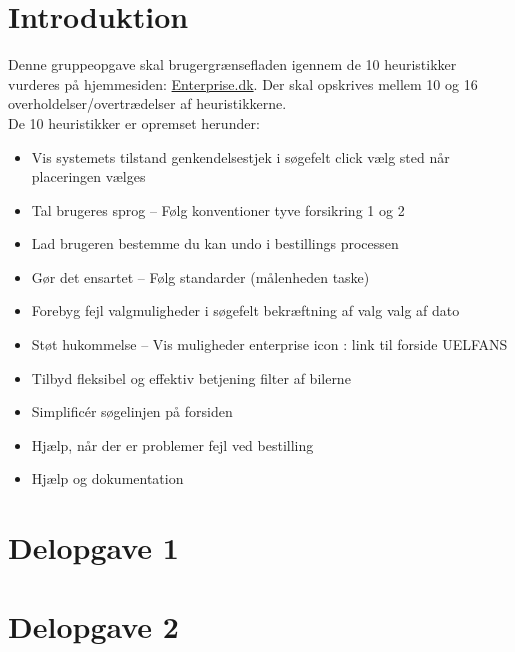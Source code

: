 \documentclass[a4paper,10pt]{article}
\begin{document}
\section*{Introduktion}
Denne gruppeopgave skal brugergrænsefladen igennem de 10 heuristikker vurderes på hjemmesiden: \href{http://enterprise.dk}{Enterprise.dk}. Der skal opskrives mellem 10 og 16 overholdelser/overtrædelser af heuristikkerne.
\vspace*{0.5cm}\\De 10 heuristikker er opremset herunder:
\begin{itemize}
    \item Vis systemets tilstand
    genkendelsestjek i søgefelt
    click vælg sted når placeringen vælges
    
    
    \item Tal brugeres sprog – Følg konventioner
    tyve forsikring 1 og 2
    
    \item Lad brugeren bestemme
    du kan undo i bestillings processen
    
    \item Gør det ensartet – Følg standarder
    (målenheden taske)
    
    \item Forebyg fejl
    valgmuligheder i søgefelt
    bekræftning af valg
    valg af dato
    
    \item Støt hukommelse – Vis muligheder
    enterprise icon : link til forside
    UELFANS
    
    \item Tilbyd fleksibel og effektiv betjening
    filter af bilerne
    
    \item Simplificér
    søgelinjen på forsiden
    
    \item Hjælp, når der er problemer
    fejl ved bestilling
    
    \item Hjælp og dokumentation  
\end{itemize}
\newpage

\section{Delopgave 1}
\section{Delopgave 2}
\end{document}
